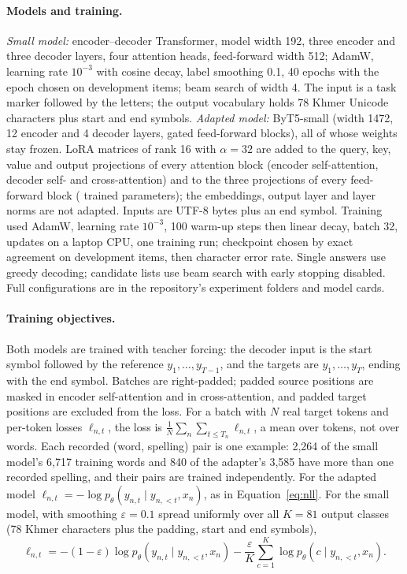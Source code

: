 \documentclass[10pt,a4paper,twocolumn]{article}
\begin{document}
\paragraph{Models and training.} \emph{Small model:} encoder--decoder Transformer, model width 192, three encoder
and three decoder layers, four attention heads, feed-forward width 512; AdamW, learning rate $10^{-3}$ with cosine
decay, label smoothing 0.1, 40 epochs with the epoch chosen on  development items; beam search of width
4. The input is a task marker followed by the letters; the output vocabulary holds 78 Khmer Unicode characters
plus start and end symbols. \emph{Adapted model:} ByT5-small (width 1472, 12 encoder and 4 decoder layers, gated
feed-forward blocks), all of whose weights stay frozen. LoRA matrices of rank 16 with $\alpha=32$ are added to the
query, key, value and output projections of every attention block (encoder self-attention, decoder self- and
cross-attention) and to the three projections of every feed-forward block ( trained parameters); the
embeddings, output layer and layer norms are not adapted. Inputs are UTF-8 bytes plus an end symbol. Training used AdamW, learning rate $10^{-3}$, 100 warm-up steps then
linear decay, batch 32,  updates on a laptop CPU, one training run; checkpoint chosen by exact
agreement on  development items, then character error rate. Single answers use greedy decoding;
candidate lists use beam search with early stopping disabled. Full configurations are in the repository's
experiment folders and model cards.

\paragraph{Training objectives.} Both models are trained with teacher forcing: the decoder input is the start
symbol followed by the reference $y_1,\dots,y_{T-1}$, and the targets are $y_1,\dots,y_T$, ending with the end
symbol. Batches are right-padded; padded source positions are masked in encoder self-attention and in
cross-attention, and padded target positions are excluded from the loss. For a batch with $N$ real target tokens
and per-token losses $\ell_{n,t}$, the loss is $\frac{1}{N}\sum_{n}\sum_{t\le T_n}\ell_{n,t}$, a mean over tokens,
not over words. Each recorded (word, spelling) pair is one example: 2,264 of the small model's 6,717 training words
and 840 of the adapter's 3,585 have more than one recorded spelling, and their pairs are trained independently.
For the adapted model $\ell_{n,t}=-\log p_\theta(y_{n,t}\mid y_{n,<t},x_n)$, as in Equation~\eqref{eq:nll}. For the
small model, with smoothing $\varepsilon=0.1$ spread uniformly over all $K=81$ output classes (78 Khmer characters
plus the padding, start and end symbols),
\begin{equation}
  \ell_{n,t}=-(1-\varepsilon)\log p_\theta(y_{n,t}\mid y_{n,<t},x_n)
  -\frac{\varepsilon}{K}\sum_{c=1}^{K}\log p_\theta(c\mid y_{n,<t},x_n).
  \label{eq:smooth}
\end{equation}
\end{document}
